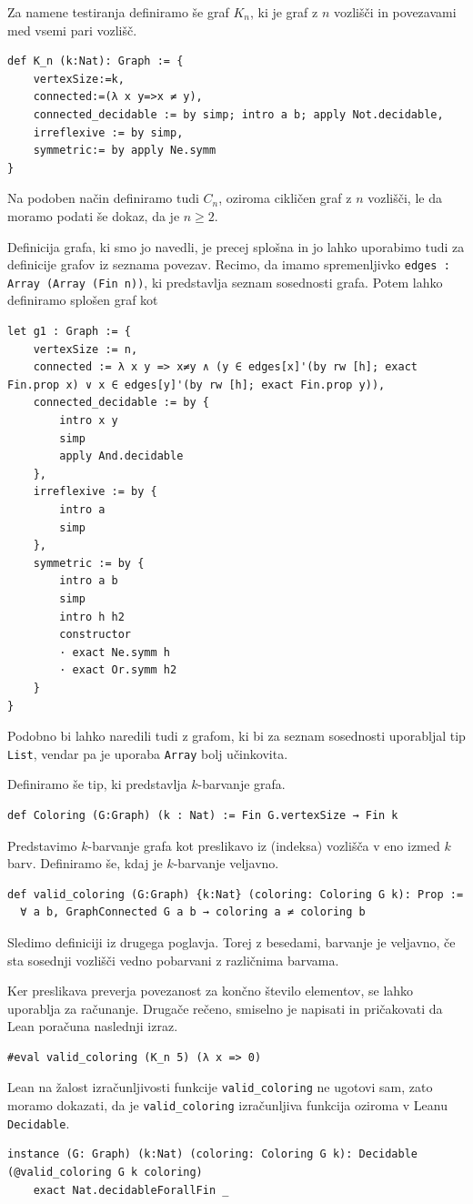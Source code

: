 \documentclass[mat1]{fmfdelo}
\begin{document}
Za namene testiranja definiramo še graf $K_n$, ki je graf z $n$ vozlišči in povezavami med vsemi pari vozlišč.
\begin{lstlisting}
def K_n (k:Nat): Graph := {
    vertexSize:=k, 
    connected:=(λ x y=>x ≠ y), 
    connected_decidable := by simp; intro a b; apply Not.decidable, 
    irreflexive := by simp, 
    symmetric:= by apply Ne.symm 
}
\end{lstlisting}
Na podoben način definiramo tudi $C_n$, oziroma cikličen graf z $n$ vozlišči, le da moramo podati še dokaz, da je $n\ge2$.

Definicija grafa, ki smo jo navedli, je precej splošna in jo lahko uporabimo tudi za definicije grafov iz seznama povezav.
Recimo, da imamo spremenljivko \lstinline{edges :  Array (Array (Fin n))}, ki predstavlja seznam sosednosti grafa.
Potem lahko definiramo splošen graf kot
\begin{lstlisting}
let g1 : Graph := {
    vertexSize := n, 
    connected := λ x y => x≠y ∧ (y ∈ edges[x]'(by rw [h]; exact Fin.prop x) ∨ x ∈ edges[y]'(by rw [h]; exact Fin.prop y)), 
    connected_decidable := by {
        intro x y
        simp
        apply And.decidable
    }, 
    irreflexive := by {
        intro a
        simp
    }, 
    symmetric := by {
        intro a b
        simp
        intro h h2
        constructor
        · exact Ne.symm h
        · exact Or.symm h2
    }
}
\end{lstlisting}
Podobno bi lahko naredili tudi z grafom, ki bi za seznam sosednosti uporabljal tip \lstinline{List}, vendar pa je uporaba \lstinline{Array} 
bolj učinkovita.

Definiramo še tip, ki predstavlja $k$-barvanje grafa.
\begin{lstlisting}
def Coloring (G:Graph) (k : Nat) := Fin G.vertexSize → Fin k
\end{lstlisting}

Predstavimo $k$-barvanje grafa kot preslikavo iz (indeksa) vozlišča v eno izmed $k$ barv.
Definiramo še, kdaj je $k$-barvanje veljavno.
\begin{lstlisting}
def valid_coloring (G:Graph) {k:Nat} (coloring: Coloring G k): Prop :=
  ∀ a b, GraphConnected G a b → coloring a ≠ coloring b
\end{lstlisting}
Sledimo definiciji iz drugega poglavja. Torej z besedami, barvanje je veljavno, 
če sta sosednji vozlišči vedno pobarvani z različnima barvama.

Ker preslikava preverja povezanost za končno število elementov, se lahko uporablja za računanje. Drugače rečeno, smiselno
je napisati in pričakovati da Lean poračuna naslednji izraz.
\begin{lstlisting}
#eval valid_coloring (K_n 5) (λ x => 0)
\end{lstlisting}
Lean na žalost izračunljivosti funkcije \lstinline{valid_coloring} ne ugotovi sam, zato moramo dokazati,
da je \lstinline{valid_coloring} izračunljiva funkcija oziroma v Leanu \lstinline|Decidable|.
\begin{lstlisting}
instance (G: Graph) (k:Nat) (coloring: Coloring G k): Decidable (@valid_coloring G k coloring)
    exact Nat.decidableForallFin _
\end{lstlisting}
\end{document}
